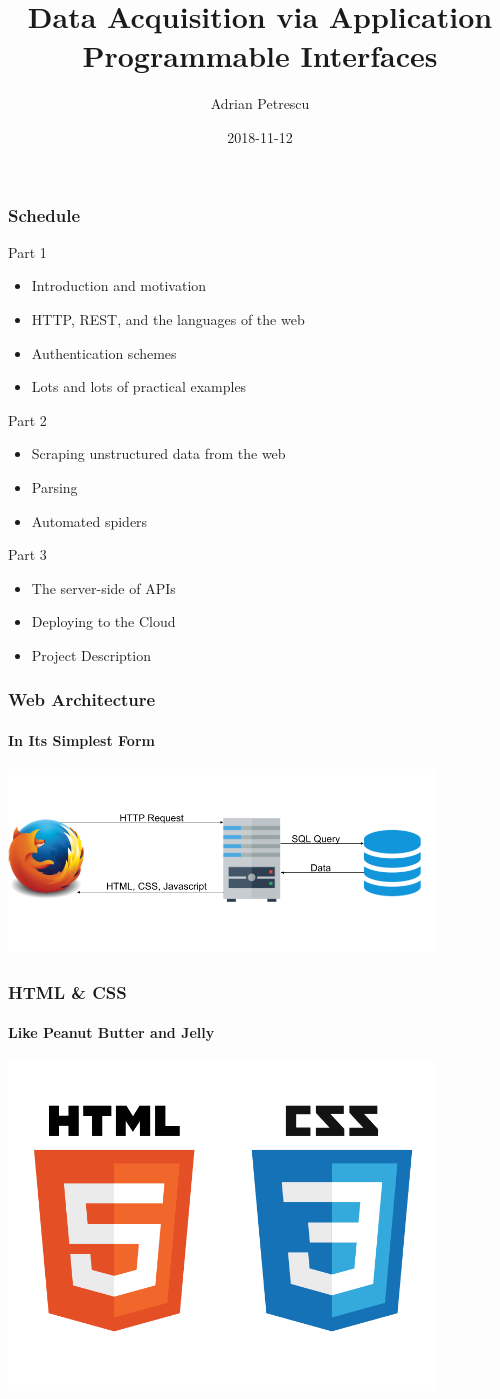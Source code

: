 \documentclass[dvipsnames]{beamer}
\title[Data Acquisition via APIs]{Data Acquisition via Application Programmable Interfaces}
\author{Adrian Petrescu}
\institute{Rubikloud}
\date{2018-11-12}
\begin{document}
\frame{\titlepage}


\begin{frame}
  \frametitle{Schedule}
  
  Part 1
  \begin{itemize}
    \item Introduction and motivation
    \item HTTP, REST, and the languages of the web
    \item Authentication schemes
    \item Lots and lots of practical examples
  \end{itemize}

  \alert{Part 2}
  \begin{itemize}
    \item Scraping unstructured data from the web
    \item Parsing 
    \item Automated spiders
  \end{itemize}

  Part 3
  \begin{itemize}
    \item The server-side of APIs
    \item Deploying to the Cloud
    \item Project Description
  \end{itemize}
\end{frame}


\begin{frame}
  \frametitle{Web Architecture}
  \framesubtitle{In Its Simplest Form}
  \includegraphics[width=320pt]{img/web-architecture-1.png}
\end{frame}


\begin{frame}
  \frametitle{HTML \& CSS}
  \framesubtitle{Like Peanut Butter and Jelly}
  \includegraphics[width=320pt]{img/html-css.png}
\end{frame}
\end{document}
